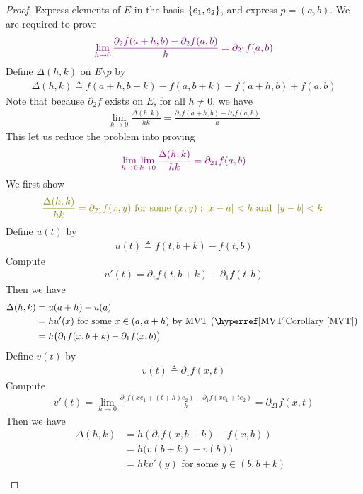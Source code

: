 \documentclass{report}
\begin{document}
\begin{proof}
Express elements of $E$ in the basis $\{ e_1,e_2 \}$, and express $p=(a,b)$. We are required to prove 
\begin{align*}
  \textcolor{violet}{\lim_{h\to 0}\frac{\partial_2f(a+h,b)-\partial_2 f(a,b)}{h}=\partial_{21}f(a,b)}
\end{align*}
Define $\Delta(h,k)$ on $E\setminus p$ by 
\begin{align*}
\Delta(h,k)\triangleq f(a+h,b+k)-f(a,b+k)-f(a+h,b)+f(a,b)
\end{align*}
Note that because $\partial_2f$ exists on $E$, for all $h\neq 0$, we have 
 \begin{align*}
\lim_{k\to 0} \frac{\Delta (h,k)}{hk}=\frac{\partial_2 f(a+h,b)-\partial_2 f(a,b)}{h}
\end{align*}
This let us reduce the problem into proving 
\begin{align*}
  \textcolor{violet}{\lim_{h\to 0}\lim_{k\to 0} \frac{\Delta (h,k)}{hk}=\partial_{21}f(a,b)}
\end{align*}
We first show 
\begin{align}
\label{oea}
  \olive{\frac{\Delta (h,k)}{hk}=\partial_{21}f(x,y)\text{ for some $(x,y):\abso{x-a}<h\text{ and }\abso{y-b}<k$ }}
\end{align}
Define $u(t)$ by 
\begin{align*}
u(t)\triangleq f(t,b+k)-f(t,b)
\end{align*}
Compute 
\begin{align*}
u'(t)=\partial_1 f(t,b+k)-\partial_1 f(t,b)
\end{align*}
Then we have
\begin{align*}
\Delta (h,k)&=u(a+h)-u(a)\\
&=hu'(x)\text{ for some $x\in (a,a+h)$ by MVT (\myref{Corollary}{MVT}) }\\
&=h\big(\partial_1 f(x,b+k)-\partial_1 f(x,b) \big)
\end{align*}
Define $v(t)$ by 
\begin{align*}
v(t)\triangleq \partial_1 f(x,t)
\end{align*}
Compute 
\begin{align*}
v'(t)=\lim_{h\to 0}\frac{\partial_1 f(xe_1+(t+h)e_2)-\partial_1 f(xe_1+te_2)}{h}=\partial_{21}f(x,t)
\end{align*}
Then we have 
\begin{align*}
\Delta (h,k)&=h(\partial_1 f(x,b+k)-f(x,b))\\
&=h\big(v(b+k)-v(b)\big)\\
&=hk v'(y)\text{ for some $y\in (b,b+k)$ }\\

\end{align*}
\end{proof}
\end{document}
